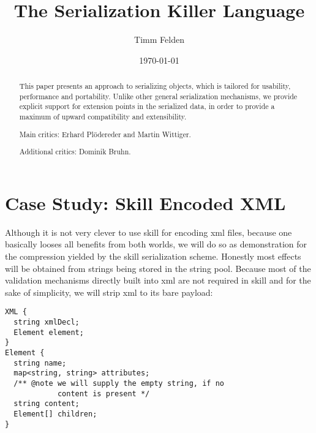 \documentclass[a4paper,10pt]{article}
\title{The Serialization Killer Language}
\author{Timm Felden}
\date{\today}
\begin{document}
\maketitle

\begin{abstract}
  This paper presents an approach to serializing objects, which is tailored for usability, performance and portability. Unlike other general serialization mechanisms, we provide explicit support for extension points in the serialized data, in order to provide a maximum of upward compatibility and extensibility.
\end{abstract}

\renewcommand{\abstractname}{Acknowledgements}
\begin{abstract}
Main critics: Erhard Plödereder and Martin Wittiger.

Additional critics: Dominik Bruhn.
\end{abstract}



\tableofcontents









\section{Case Study: Skill Encoded XML}
Although it is not very clever to use skill for encoding xml files, because one basically looses all benefits from both worlds, we will do so as demonstration for the compression yielded by the skill serialization scheme. Honestly most effects will be obtained from strings being stored in the string pool. Because most of the validation mechanisms directly built into xml are not required in skill and for the sake of simplicity, we will strip xml to its bare payload:
\begin{lstlisting}[label=sex,caption=Skill Encoded XML]
XML {
  string xmlDecl;
  Element element;
}
Element {
  string name;
  map<string, string> attributes;
  /** @note we will supply the empty string, if no
            content is present */
  string content;
  Element[] children;
}
\end{lstlisting}
\end{document}
